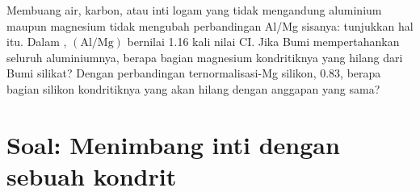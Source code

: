\begin{exercise}[$\star\star\star$]\label{exo:b2:elements-in-the-earth:12}
Membuang air, karbon, atau inti logam yang tidak mengandung aluminium maupun
magnesium tidak mengubah perbandingan Al/Mg sisanya: tunjukkan hal itu. Dalam , $(\mathrm{Al}/\mathrm{Mg})$ bernilai 1.16 kali nilai CI. Jika
Bumi mempertahankan seluruh aluminiumnya, berapa bagian magnesium kondritiknya yang
hilang dari Bumi silikat? Dengan perbandingan ternormalisasi-Mg silikon,
0.83, berapa bagian silikon kondritiknya yang akan hilang dengan
anggapan yang sama?
\end{exercise}

\section{Soal: Menimbang inti dengan sebuah kondrit}

